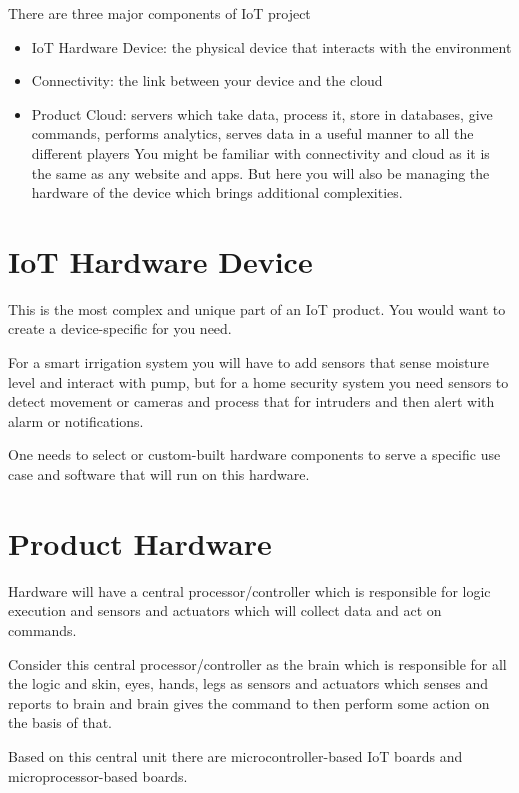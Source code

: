 \documentclass[12pt]{report}
\begin{document}
There are three major components of IoT project
\begin{itemize}
    \item IoT Hardware Device: the physical device that interacts with the environment
    \item Connectivity: the link between your device and the cloud
    \item {Product Cloud: servers which take data, process it, store in databases, give commands, performs analytics, serves data in a useful manner to all the different players You might be familiar with connectivity and cloud as it is the same as any website and apps. But here you will also be managing the hardware of the device which brings additional complexities.}
\end{itemize}


\section{IoT Hardware Device}

This is the most complex and unique part of an IoT product. You would want to create a device-specific for you need.

For a smart irrigation system you will have to add sensors that sense moisture level and interact with pump, but for a home security system you need sensors to detect movement or cameras and process that for intruders and then alert with alarm or notifications.

One needs to select or custom-built hardware components to serve a specific use case and software that will run on this hardware.

\section{Product Hardware}

Hardware will have a central processor/controller which is responsible for logic execution and sensors and actuators which will collect data and act on commands.

Consider this central processor/controller as the brain which is responsible for all the logic and skin, eyes, hands, legs as sensors and actuators which senses and reports to brain and brain gives the command to then perform some action on the basis of that.

Based on this central unit there are microcontroller-based IoT boards and microprocessor-based boards.
\end{document}
